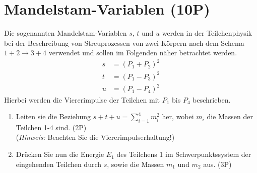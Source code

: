 \section{Mandelstam-Variablen (10P)}
Die sogenannten Mandelstam-Variablen $s,\,t$ und $u$ werden in der Teilchenphysik bei der Beschreibung von Streuprozessen von zwei Körpern nach dem Schema $1 + 2 \rightarrow 3 + 4$ verwendet und sollen im Folgenden näher betrachtet werden.
%
\begin{align*}
 s &= \left(P_1 + P_2 \right)^2 \\
 t &= \left(P_1 - P_3 \right)^2 \\
 u &= \left(P_1 - P_4 \right)^2
\end{align*}
%
Hierbei werden die Viererimpulse der Teilchen mit $P_1$ bis $P_4$ beschrieben.
%
\begin{enumerate}[label=\alph*)]
 \item Leiten sie die Beziehung $s+t+u = \sum_{i=1}^4 m_i^2$ her, wobei $m_i$ die Massen der Teilchen 1-4 sind. (2P) \\(\textit{Hinweis: }Beachten Sie die Viererimpulserhaltung!)
 \item Drücken Sie nun die Energie $E_1$ des Teilchens 1 im Schwerpunktssystem der eingehenden Teilchen durch $s$, sowie die Massen $m_1$ und $m_2$ aus. (3P)
\end{enumerate}
